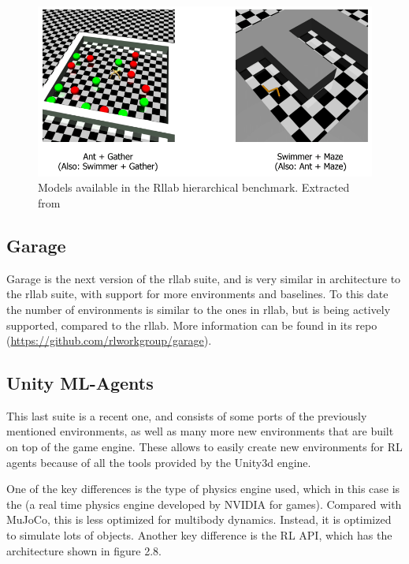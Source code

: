     \begin{figure}[!ht]
        \centering
        \includegraphics[width=5.0in]{./chapters/imgs/img_rllab_envs_hierarchical.png}
        \caption[rllab hierarchical models]{Models available in the Rllab hierarchical benchmark. Extracted from \citet{Rllab}}
        \label{fig:rllab-envs-hierarchical}
    \end{figure}

    \subsection{Garage}
    Garage is the next version of the rllab suite, and is very similar in architecture to the rllab suite, with support
    for more environments and baselines. To this date the number of environments is similar to the ones in rllab, but is
    being actively supported, compared to the rllab. More information can be found in its repo (\url{https://github.com/rlworkgroup/garage}).
 
    \subsection{Unity ML-Agents}
    This last suite \citep{unity-ml-agents} is a recent one, and consists of some ports of the previously mentioned environments, as well
    as many more new environments that are built on top of the \citeauthor{unity} game engine. These allows to easily create new environments
    for RL agents because of all the tools provided by the Unity3d engine.

    One of the key differences is the type of physics engine used, which in this case is the \citeauthor{physX} (a real time physics engine
    developed by NVIDIA for games). Compared with MuJoCo, this is less optimized for multibody dynamics. Instead, it is optimized to simulate
    lots of objects. Another key difference is the RL API, which has the architecture shown in figure 2.8.

